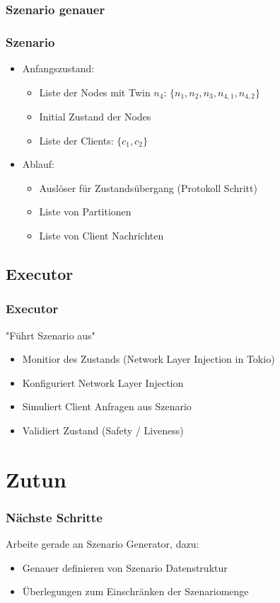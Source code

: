 \documentclass{beamer}
\begin{document}
\subsubsection{Szenario genauer}
\begin{frame}
 \frametitle{Szenario}
 \begin{itemize}
  \item Anfangszustand:
  \begin{itemize}
   \item Liste der Nodes mit Twin $n_4$: $\{n_1,n_2,n_3,n_{4,1},n_{4,2}\}$

   \item Initial Zustand der Nodes
   \item Liste der Clients: $\{c_1,c_2\}$
  \end{itemize}
  \item Ablauf:
  \begin{itemize}
   \item Auslöser für Zustandsübergang (Protokoll Schritt)
   \item Liste von Partitionen
   \item Liste von Client Nachrichten
  \end{itemize}

 \end{itemize}
\end{frame}

\subsection{Executor}
\begin{frame}
\frametitle{Executor}
"Führt Szenario aus"
 \begin{itemize}
  \item Monitior des Zustands (Network Layer Injection in Tokio)
  \item Konfiguriert Network Layer Injection
  \item Simuliert Client Anfragen aus Szenario
  \item Validiert Zustand (Safety / Liveness)
 \end{itemize}
\end{frame}

\section{Zutun}
\begin{frame}
\frametitle{Nächste Schritte}
Arbeite gerade an Szenario Generator, dazu:
 \begin{itemize}
  \item Genauer definieren von Szenario Datenstruktur
  \item Überlegungen zum Einschränken der Szenariomenge
 \end{itemize}
\end{frame}
\end{document}
